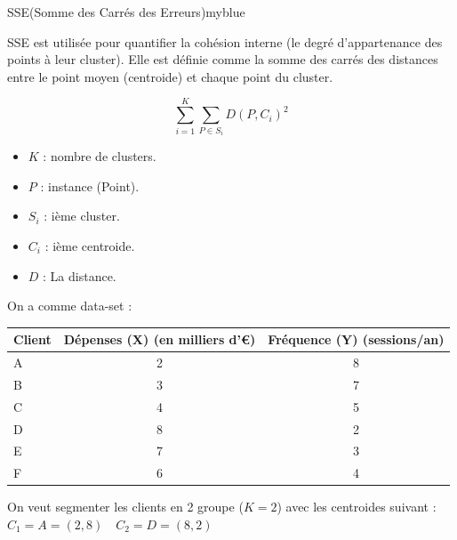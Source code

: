 \documentclass{article}
\begin{document}
\vspace{0.15cm}
\begin{prettyBox}{SSE(Somme des Carrés des Erreurs)}{myblue}

   SSE est utilisée pour quantifier la cohésion interne (le degré d'appartenance des points à leur cluster). Elle est définie comme la somme des carrés des distances entre le
   point moyen (centroide) et chaque point du cluster.

    \[\sum_{i=1}^K \sum_{P \in S_i } D(P,C_i)^2\]

    \begin{itemize}
        \setlength{\itemsep}{0pt}
        \item $K$ : nombre de clusters.
        \item $P$ : instance (Point).
        \item $S_i$ : ième cluster.
        \item $C_i$ : ième centroide.
        \item $D$ : La distance.
    \end{itemize}
\end{prettyBox}

\newpage

On a comme data-set :

\begin{table}[h]
\centering

\renewcommand{\arraystretch}{1.5} 
\setlength{\tabcolsep}{12pt}      

\begin{tabular}{|l|c|c|} 
\hline
\textbf{Client} & \textbf{Dépenses (X) (en milliers d'€)} & \textbf{Fréquence (Y) (sessions/an)} \\ \hline
A        & 2          & 8        \\ \hline
B          & 3           & 7             \\ \hline
C      & 4      & 5           \\ \hline
D        & 8          & 2        \\ \hline
E          & 7           & 3             \\ \hline
F      & 6     & 4          \\ \hline

\end{tabular}
\end{table}

On veut segmenter les clients en 2 groupe ($K=2$) avec les centroides suivant :\\[0.1cm]
$C_1 = A = (2,8) \quad C_2 = D = (8,2) $
\end{document}

